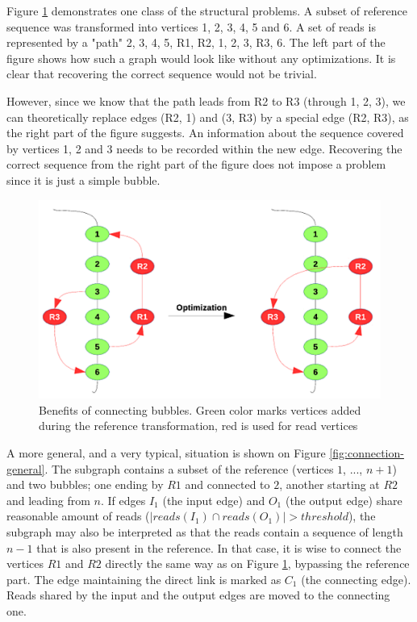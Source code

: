 Figure \ref{fig:bubble-connection} demonstrates one class of the structural problems. A subset of reference sequence was transformed into vertices 1, 2, 3, 4, 5 and 6. A set of reads is represented by a "path" 2, 3, 4, 5, R1, R2, 1, 2, 3, R3, 6.  The left part of the figure shows how such a graph would look like without any optimizations. It is clear that recovering the correct sequence would not be trivial. 

However, since we know that the path leads from R2 to R3 (through 1, 2, 3), we can theoretically replace edges (R2, 1) and (3, R3) by a special edge (R2, R3), as the right part of the figure suggests. An information about the sequence covered by vertices 1, 2 and 3 needs to be recorded within the new edge. Recovering the correct sequence from the right part of the figure does not impose a problem since it is just a simple bubble. 

\begin{figure}
	\centering
	\includegraphics{img/bubble-connection.pdf}
	\caption{Benefits of connecting bubbles. Green color marks vertices added during the reference transformation, red is used for read vertices}
	\label{fig:bubble-connection}
\end{figure}

A more general, and a very typical, situation is shown on Figure \ref{fig:connection-general}. The subgraph contains a subset of the reference (vertices $1$, $...$, $n+1$) and two bubbles; one ending by $R1$ and connected to $2$, another starting at $R2$ and leading from $n$. If edges $I_1$ (the input edge) and $O_1$ (the output edge) share reasonable amount of reads ($|reads(I_1) \cap reads(O_1)| > threshold$), the subgraph may also be interpreted as that the reads contain a sequence of length $n-1$ that is also present in the reference. In that case, it is wise to connect the vertices $R1$ and $R2$ directly the same way as on Figure \ref{fig:bubble-connection}, bypassing the reference part. The edge maintaining the direct link is marked as $C_1$ (the connecting edge). Reads shared by the input and the output edges are moved to the connecting one.

